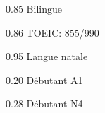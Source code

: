 
    {0.85}
    {Bilingue}
    {}{}{}

    {0.86}
    {TOEIC: 855/990}
    {}{}{}

    {0.95}
    {Langue natale}
    {}{}{}

    {0.20}
    {Débutant A1}
    {}{}{}

    {0.28}
    {Débutant N4}
    {}{}{}
